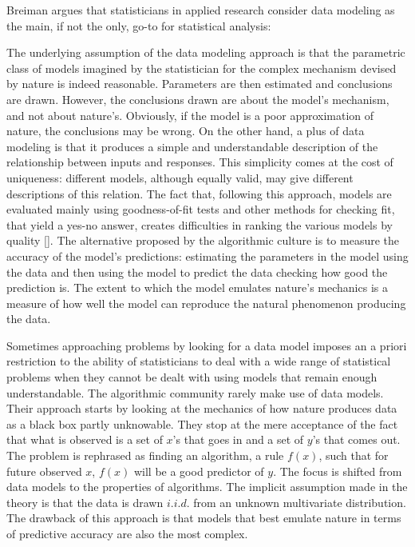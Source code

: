 Breiman argues that statisticians in applied research consider data modeling as the main, if not the only, go-to for statistical analysis: 
\begin{displayquote}
\end{displayquote}
The underlying assumption of the data modeling approach is that the parametric class of models imagined by the statistician for the complex mechanism devised by nature is indeed reasonable. Parameters are then estimated and conclusions are drawn. However, the conclusions drawn are about the model's mechanism, and not about nature's. Obviously, if the model is a poor approximation of nature, the conclusions may be wrong. On the other hand, a plus of data modeling is that it produces a simple and understandable description of the relationship between inputs and responses. This simplicity comes at the cost of uniqueness: different models, although equally valid, may give different descriptions of this relation. The fact that, following this approach, models are evaluated mainly using goodness-of-fit tests and other methods for checking fit, that yield a yes-no answer, creates difficulties in ranking the various models by quality [\cite{Breiman2001}]. The alternative proposed by the algorithmic culture is to measure the accuracy of the model's predictions: estimating the parameters in the model using the data and then using the model to predict the data checking how good the prediction is. The extent to which the model emulates nature's mechanics is a measure of how well the model can reproduce the natural phenomenon producing the data.

Sometimes approaching problems by looking for a data model imposes an a priori restriction to the ability of statisticians to deal with a wide range of statistical problems when they cannot be dealt with using models that remain enough understandable. The algorithmic community rarely make use of data models. Their approach starts by looking at the mechanics of how nature produces data as a black box partly unknowable. They stop at the mere acceptance of the fact that what is observed is a set of $x$'s that goes in and a set of $y$'s that comes out. The problem is rephrased as finding an algorithm, a rule $f(x)$, such that for future observed $x$, $f(x)$ will be a good predictor of $y$. The focus is shifted from data models to the properties of algorithms. The implicit assumption made in the theory is that the data is drawn $i.i.d.$ from an unknown multivariate distribution. The drawback of this approach is that models that best emulate nature in terms of predictive accuracy are also the most complex. 

